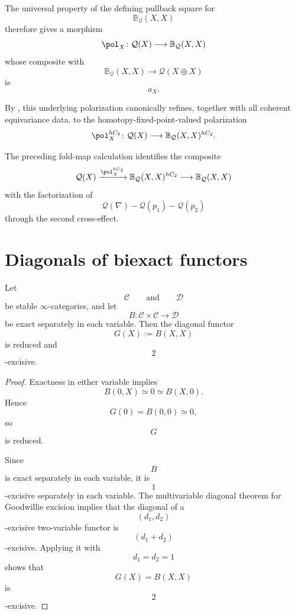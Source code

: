 \begin{definition}
The universal property of the defining pullback square for
\[
    \mathbb B_{\mathcal Q}(X,X)
\]
therefore gives a morphism
\[
    \pol_X
    \colon
    \mathcal Q(X)
    \longrightarrow
    \mathbb B_{\mathcal Q}(X,X)
\]
whose composite with
\[
    \mathbb B_{\mathcal Q}(X,X)
    \longrightarrow
    \mathcal Q(X\oplus X)
\]
is
\[
    a_X.
\]

By
\cite[Lemma~1.1.10]{CalmesDottoHarpazEtAl},
this underlying polarization canonically refines, together with all
coherent equivariance data, to the homotopy-fixed-point-valued
polarization
\[
    \pol_X^{hC_2}
    \colon
    \mathcal Q(X)
    \longrightarrow
    \mathbb B_{\mathcal Q}(X,X)^{hC_2}.
\]

The preceding fold-map calculation identifies the composite
\[
    \mathcal Q(X)
    \xrightarrow{\pol_X^{hC_2}}
    \mathbb B_{\mathcal Q}(X,X)^{hC_2}
    \longrightarrow
    \mathbb B_{\mathcal Q}(X,X)
\]
with the factorization of
\[
    \mathcal Q(\nabla)
    -
    \mathcal Q(p_1)
    -
    \mathcal Q(p_2)
\]
through the second cross-effect.
\end{definition}

\section{Diagonals of biexact functors}
\label{sec:diagonal-biexact-functors}

\begin{lemma}
\label{lem:diagonal-biexact-two-excisive}
Let
\[
    \mathcal C
    \qquad\text{and}\qquad
    \mathcal D
\]
be stable $\infty$-categories, and let
\[
    B
    \colon
    \mathcal C\times\mathcal C
    \longrightarrow
    \mathcal D
\]
be exact separately in each variable. Then the diagonal functor
\[
    G(X)
    :=
    B(X,X)
\]
is reduced and
\[
    2
\]
-excisive.
\end{lemma}

\begin{proof}
Exactness in either variable implies
\[
    B(0,X)
    \simeq
    0
    \simeq
    B(X,0).
\]
Hence
\[
    G(0)
    =
    B(0,0)
    \simeq
    0,
\]
so
\[
    G
\]
is reduced.

Since
\[
    B
\]
is exact separately in each variable, it is
\[
    1
\]
-excisive separately in each variable. The multivariable diagonal theorem
for Goodwillie excision implies that the diagonal of a
\[
    (d_1,d_2)
\]
-excisive two-variable functor is
\[
    (d_1+d_2)
\]
-excisive. Applying it with
\[
    d_1=d_2=1
\]
shows that
\[
    G(X)=B(X,X)
\]
is
\[
    2
\]
-excisive.
\end{proof}


